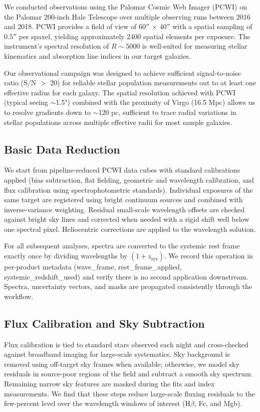\documentclass[linenumbers,trackchanges,twocolumn]{aastex631}
\begin{document}
We conducted observations using the Palomar Cosmic Web Imager (PCWI) on the Palomar 200-inch Hale Telescope over multiple observing runs between 2016 and 2018. PCWI provides a field of view of $60''\,\times\,40''$ with a spatial sampling of $0.5''$ per spaxel, yielding approximately 2400 spatial elements per exposure. The instrument's spectral resolution of $R\sim5000$ is well-suited for measuring stellar kinematics and absorption line indices in our target galaxies.

Our observational campaign was designed to achieve sufficient signal-to-noise ratio (S/N $>$ 20) for reliable stellar population measurements out to at least one effective radius for each galaxy. The spatial resolution achieved with PCWI (typical seeing $\sim$1.5") combined with the proximity of Virgo (16.5 Mpc) allows us to resolve gradients down to $\sim$120 pc, sufficient to trace radial variations in stellar populations across multiple effective radii for most sample galaxies.

\subsection{Basic Data Reduction}

We start from pipeline-reduced PCWI data cubes with standard calibrations applied (bias subtraction, flat fielding, geometric and wavelength calibration, and flux calibration using spectrophotometric standards). Individual exposures of the same target are registered using bright continuum sources and combined with inverse-variance weighting. Residual small-scale wavelength offsets are checked against bright sky lines and corrected when needed with a rigid shift well below one spectral pixel. Heliocentric corrections are applied to the wavelength solution.

For all subsequent analyses, spectra are converted to the systemic rest frame exactly once by dividing wavelengths by $(1+z_\mathrm{sys})$. We record this operation in per-product metadata (wave\_frame, rest\_frame\_applied, systemic\_redshift\_used) and verify there is no second application downstream. Spectra, uncertainty vectors, and masks are propagated consistently through the workflow.

\subsection{Flux Calibration and Sky Subtraction}

Flux calibration is tied to standard stars observed each night and cross-checked against broadband imaging for large-scale systematics. Sky background is removed using off-target sky frames when available; otherwise, we model sky residuals in source-poor regions of the field and subtract a smooth sky spectrum. Remaining narrow sky features are masked during the fits and index measurements. We find that these steps reduce large-scale fluxing residuals to the few-percent level over the wavelength windows of interest (H$\beta$, Fe, and Mgb).
\end{document}
